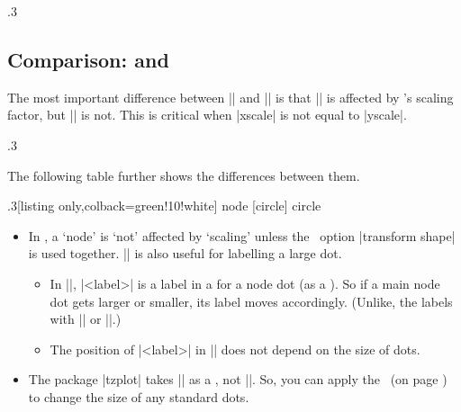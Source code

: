 \begin{tzcode}{.3}
\end{tzcode}


\subsection{Comparison: \protect\cmd{\tzdot} and \protect\cmd{\tzcdot}}
\label{ss:tzdot:comparison}

The most important difference between |\tzcdot| and |\tzdot| is that |\tzcdot| is affected by \Tikz's scaling factor, but |\tzdot| is not.
This is critical when |xscale| is not equal to |yscale|.

\begin{tzcode}{.3}
\end{tzcode}

The following table further shows the differences between them.

\begin{tzcode}{.3}[listing only,colback=green!10!white]
node [circle]   \tzdot    \tzdots    \settzdotsize      [tzdot=2.4pt]  %
circle          \tzcdot   \tzcdots   \settzcdotradius   [tzcdot=1.2pt] %
\end{tzcode}

\remark 
\begin{itemize}\firmlist
\item In \Tikz, a `node' is `not' affected by `scaling' unless the \Tikz\ option |transform shape| is used together.
|\tzdot| is also useful for labelling a large dot.
  \begin{itemize}
  \item In |\tzdot|, |<label>| is a label in a  for a node dot (as a ).
  So if a main node dot gets larger or smaller, its label moves accordingly. 
  (Unlike, the labels with |\tzcdot| or |\tzcdots|.)
  \item The position of |<label>| in |\tzcdot| does not depend on the size of dots.
  \end{itemize}
\item The package |tzplot| takes |\tzdot| as a , not |\tzcdot|.
So, you can apply the \threeways\ (on page \pageref{ss:threeways}) to change the size of any standard dots.
\end{itemize}


